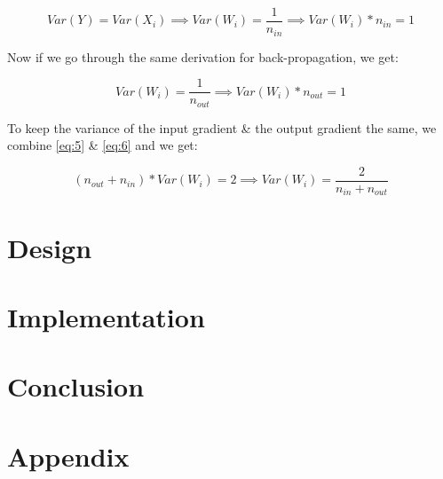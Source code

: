 \documentclass[12pt]{article}
\begin{document}
\begin{center}
	\begin{equation}
	 Var(Y) = Var(X_i) \implies Var(W_i) = \frac{1}{n_{in}} \implies Var(W_i) * n_{in} = 1  \label{eq:5}
	\end{equation}
\end{center}
Now if we go through the same derivation for back-propagation, we get:
\begin{center}
	\begin{equation}
	Var(W_i) = \frac{1}{n_{out}} \implies Var(W_i) * n_{out} = 1 \label{eq:6}
	\end{equation}
\end{center}
To keep the variance of the input gradient \& the output gradient the same, we combine
\eqref{eq:5} \& \eqref{eq:6} and we get:
\begin{center}
	\begin{equation}
	(n_{out} + n_{in}) * Var(W_i) = 2 \implies Var(W_i) = \frac{2}{n_{in} + n_{out}} \label{eq:7}
	\end{equation}
\end{center}
\newpage
\section{\textbf{Design}}\label{sec:design}
\newpage
\section{\textbf{Implementation}}\label{sec:implementation}
\newpage
\section{\textbf{Conclusion}}\label{sec:conclusion}
\newpage

\medskip


\newpage

\appendix
\section*{\textbf{Appendix}}
\end{document}

